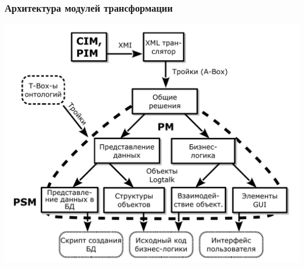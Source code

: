 \documentclass[10pt]{beamer}
\begin{document}
\begin{frame}
  \frametitle{Архитектура модулей трансформации}
  \centering
  \includegraphics[width=0.9\linewidth]{architect_tree_pres-ru-wo-OCL.pdf}
\end{frame}
\end{document}
